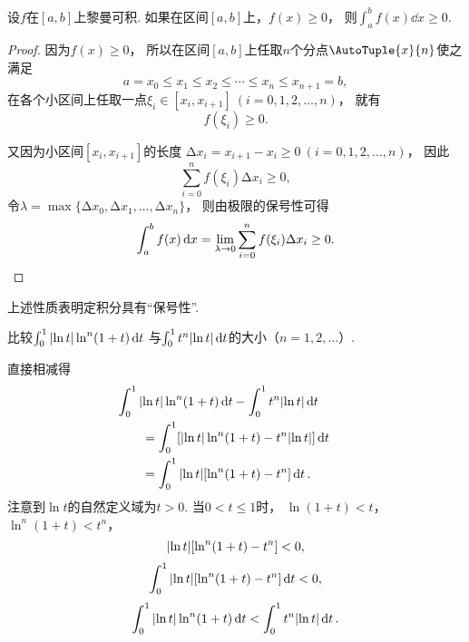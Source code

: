 
\begin{property}\label{theorem:定积分.定积分性质5}
设\(f\)在\([a,b]\)上黎曼可积.
如果在区间\([a,b]\)上，\(f(x) \geq 0\)，
则\(\int_a^b f(x) \dd{x} \geq 0\).
\begin{proof}
因为\(f(x) \geq 0\)，
所以在区间\([a,b]\)上任取\(n\)个分点\(\AutoTuple{x}{n}\)使之满足\[
	a = x_0 \leq x_1 \leq x_2 \leq \dotsb \leq x_n \leq x_{n+1} = b,
\]
在各个小区间上任取一点\(\xi_i\in[x_i,x_{i+1}]\ (i=0,1,2,\dotsc,n)\)，
就有\[
	f(\xi_i)\geq0.
\]

又因为小区间\([x_i,x_{i+1}]\)的长度
\(\increment x_i = x_{i+1}-x_i \geq 0\ (i=0,1,2,\dotsc,n)\)，
因此\[
	\sum_{i=0}^n f(\xi_i) \increment x_i \geq 0,
\]
令\(\lambda = \max\{\increment x_0, \increment x_1, \dotsc, \increment x_n\}\)，
则由极限的保号性可得\[
	\int_a^b f(x) \dd{x}
	= \lim_{\lambda\to0} \sum_{i=0}^n f(\xi_i) \Delta x_i \geq 0.
	\qedhere
\]
\end{proof}
\end{property}
上述性质表明定积分具有“保号性”.

\begin{example}
比较\(\int_0^1 \abs{\ln t} \ln^n(1+t) \dd{t}\)
与\(\int_0^1 t^n \abs{\ln t} \dd{t}\)的大小（\(n=1,2,\dotsc\)）.
\begin{solution}
直接相减得
\begin{align*}
	&\hspace{-20pt}
	\int_0^1 \abs{\ln t} \ln^n(1+t) \dd{t} - \int_0^1 t^n \abs{\ln t} \dd{t} \\
	&= \int_0^1 [\abs{\ln t} \ln^n(1+t) - t^n \abs{\ln t}] \dd{t} \\
	&= \int_0^1 \abs{\ln t} [\ln^n(1+t) - t^n] \dd{t}.
\end{align*}
注意到\(\ln t\)的自然定义域为\(t > 0\).
当\(0 < t \leq 1\)时，
\(\ln(1+t) < t\)，
\(\ln^n(1+t) < t^n\)，
\[
	\abs{\ln t} [\ln^n(1+t) - t^n] < 0,
\]\[
	\int_0^1 \abs{\ln t} [\ln^n(1+t) - t^n] \dd{t} < 0,
\]\[
	\int_0^1 \abs{\ln t} \ln^n(1+t) \dd{t} < \int_0^1 t^n \abs{\ln t} \dd{t}.
\]
\end{solution}
\end{example}

